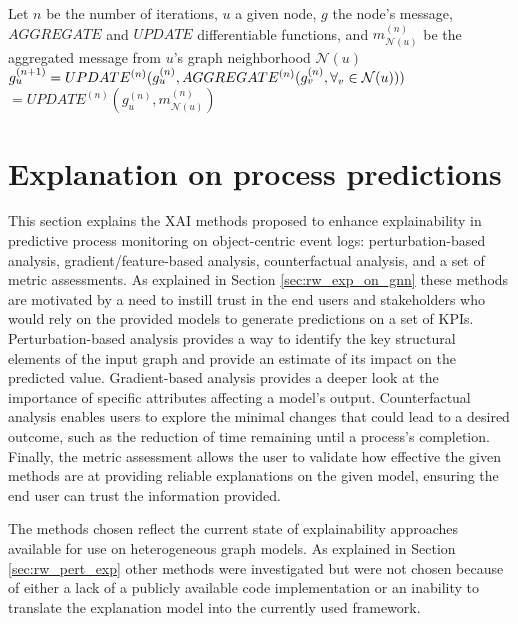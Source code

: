         \begin{definition}
        \label{def:GNN}
            Let $n$ be the number of iterations, $u$ a given node, $g$ the node's message, $AGGREGATE$ and $UPDATE$ differentiable functions, and $m_{\mathcal{N}(u)}^{(n)}$ be the aggregated message from $u$'s graph neighborhood $\mathcal{N}(u)$
            $g_u^{(n+1)} = UPDATE^{(n)}(g_u^{(n)},AGGREGATE^{(n)}\newline(g_v^{(n)},\forall_v \in \mathcal{N}(u)))$
                            $=UPDATE^{(n)}(g_u^{(n)},m_{\mathcal{N}(u)}^{(n)})$
        \end{definition}
        
    \section{Explanation on process predictions}
    \label{sec:dataset_explanations}
        This section explains the XAI methods proposed to enhance explainability in predictive process monitoring on object-centric event logs: perturbation-based analysis, gradient/feature-based analysis, counterfactual analysis, and a set of metric assessments. As explained in Section \ref{sec:rw_exp_on_gnn} these methods are motivated by a need to instill trust in the end users and stakeholders who would rely on the provided models to generate predictions on a set of KPIs. Perturbation-based analysis provides a way to identify the key structural elements of the input graph and provide an estimate of its impact on the predicted value. Gradient-based analysis provides a deeper look at the importance of specific attributes affecting a model's output. Counterfactual analysis enables users to explore the minimal changes that could lead to a desired outcome, such as the reduction of time remaining until a process's completion. Finally, the metric assessment allows the user to validate how effective the given methods are at providing reliable explanations on the given model, ensuring the end user can trust the information provided.

        The methods chosen reflect the current state of explainability approaches available for use on heterogeneous graph models. As explained in Section \ref{sec:rw_pert_exp} other methods were investigated but were not chosen because of either a lack of a publicly available code implementation or an inability to translate the explanation model into the currently used framework.

